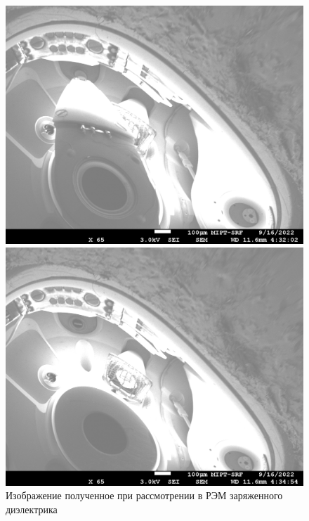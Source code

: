 \documentclass[a4paper,12pt]{article} %
\begin{document}
\begin{figure}[h]
\begin{minipage}{0.49\textwidth}
\vspace{0.5em}
\includegraphics[width=\textwidth]{Foam003.jpg}
\vspace{-2em}
\end{minipage}
\begin{minipage}{0.49\textwidth}
\vspace{0.5em}
\includegraphics[width=\textwidth]{Foam004.jpg}
\vspace{-2em}
\end{minipage}
\caption{Изображение полученное при рассмотрении в РЭМ заряженного диэлектрика}
\label{fig:reflect}
\end{figure}
\end{document}
